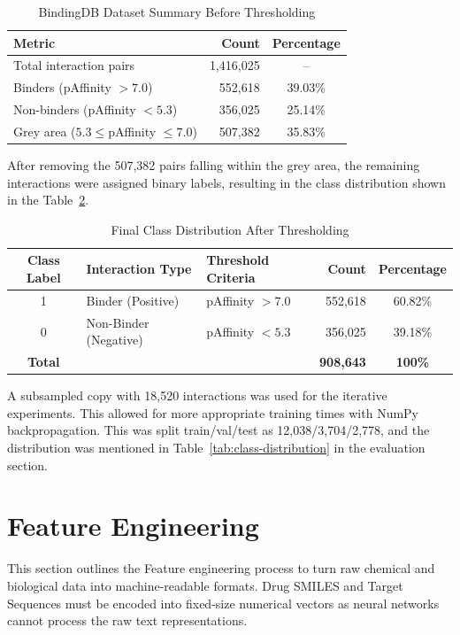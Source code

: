 \begin{table}[htbp]
\centering
\caption{BindingDB Dataset Summary Before Thresholding}
\label{tab:dataset-before-threshold}
\begin{tabular}{lrc}
\toprule
\textbf{Metric} & \textbf{Count} & \textbf{Percentage} \\
\midrule
Total interaction pairs                          & 1,416,025 & --      \\
Binders (pAffinity $> 7.0$)                      & 552,618   & 39.03\% \\
Non-binders (pAffinity $< 5.3$)                  & 356,025   & 25.14\% \\
Grey area ($5.3 \leq$pAffinity $\leq 7.0$)      & 507,382   & 35.83\% \\
\bottomrule
\end{tabular}
\end{table}

After removing the 507,382 pairs falling within the grey area, the remaining interactions were assigned binary labels, resulting in the class distribution shown in the Table~\ref{tab:class-distribution1}.
\begin{table}[H]
\centering
\caption{Final Class Distribution After Thresholding}
\label{tab:class-distribution1}
\begin{tabular}{cllrc}
\toprule
\textbf{Class Label} & \textbf{Interaction Type} & \textbf{Threshold Criteria} & \textbf{Count} & \textbf{Percentage} \\
\midrule
1     & Binder (Positive)      & pAffinity $> 7.0$ & 552,618 & 60.82\% \\
0     & Non-Binder (Negative)  & pAffinity $< 5.3$ & 356,025 & 39.18\% \\
\midrule
\textbf{Total} & & & \textbf{908,643} & \textbf{100\%} \\
\bottomrule
\end{tabular}
\end{table}
A subsampled copy with 18,520 interactions was used for the iterative experiments.
This allowed for more appropriate training times with NumPy backpropagation.
This was split train/val/test as 12,038/3,704/2,778, and the distribution was mentioned in Table~\ref{tab:class-distribution} in the evaluation section.

\section{Feature Engineering}
This section outlines the Feature engineering process to turn raw chemical and biological data into machine-readable formats.
Drug SMILES and Target Sequences must be encoded into fixed-size numerical vectors as neural networks cannot process the raw text representations.
